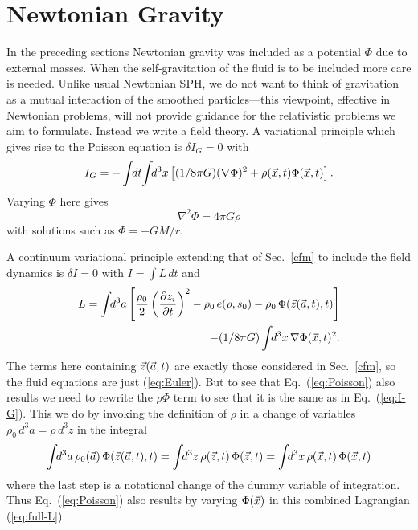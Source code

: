     \section{Newtonian Gravity}\label{Newton}
    In the preceding sections Newtonian gravity was included as a
potential $\Phi$ due to external masses.  When the self-gravitation
of the fluid is to be included more care is needed.  Unlike usual
Newtonian SPH, we do not want to think of gravitation as a mutual
interaction of the smoothed particles---this viewpoint, effective
in Newtonian problems, will not provide guidance for the relativistic
problems we aim to formulate.  Instead we write a field theory.  A
variational principle which gives rise to the Poisson equation is 
$\delta I_G = 0$ with
    \begin{equation}\label{eq:I-G}
    I_G = -\int\!\!dt\!\int\!\!d^3x \left[  
            (1/8\pi G)(\nabla \Phi)^2 + \rho({\vec x},t) \Phi({\vec x},t) \right] .
    \end{equation}
    Varying $\Phi$ here gives
    \begin{equation}\label{eq:Poisson}
    \nabla^2 \Phi = 4 \pi G \rho 
    \end{equation}
    with solutions such as $\Phi = -GM/r$.

    A continuum variational principle extending that of
Sec.~\ref{cfm} to include the field dynamics is $\delta I = 0$ with 
$I = \int\!L\,dt$ and
    \begin{eqnarray}\label{eq:full-L}
    L = \int\!\! d^3a \left[\frac{\rho_0}{2} \left(
\frac{\partial z_i}{\partial t}\right)^2 
- \rho_0\, e(\rho,s_0) - \rho_0\, \Phi({\vec z}({\vec a},t),t) \right] 
             \nonumber \\
      - (1/8\pi G)\int\!\!d^3x\,\nabla \Phi({\vec x},t)^2  .
    \end{eqnarray}
    The terms here containing ${\vec z}({\vec a},t)$ are exactly those considered
in Sec.~\ref{cfm}, so the fluid equations are just (\ref{eq:Euler}).
    But to see that Eq.~(\ref{eq:Poisson}) also results we need to
rewrite the $\rho\Phi$ term to see that it is the same as in
Eq.~(\ref{eq:I-G}).
    This we do by invoking the definition of $\rho$ in a change of
variables $\rho_0\,d^3a = \rho\,d^3z$ in the integral
    \begin{equation}\label{eq:rhoPhi}
    \int\!\! d^3a\, \rho_0({\vec a})\, \Phi({\vec z}({\vec a},t),t) =
    \int\!\! d^3z\, \rho({\vec z},t)\, \Phi({\vec z},t) =
    \int\!\! d^3x\, \rho({\vec x},t)\, \Phi({\vec x},t)
    \end{equation}
    where the last step is a notational change of the dummy variable
of integration.    
    Thus Eq.~(\ref{eq:Poisson}) also results by varying $\Phi({\vec x})$ in
this combined Lagrangian (\ref{eq:full-L}).


